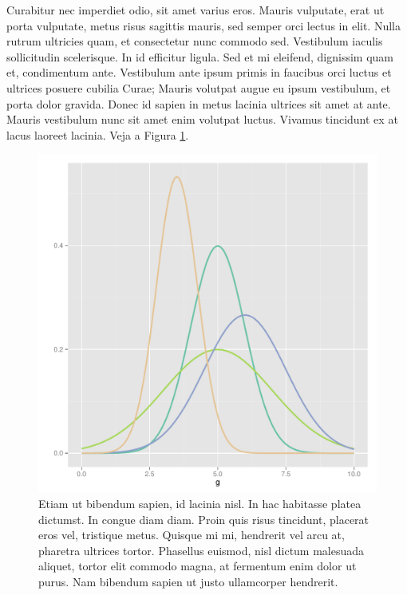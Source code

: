 \begin{btUnit}
Curabitur nec imperdiet odio, sit amet varius eros. Mauris vulputate,
erat ut porta vulputate, metus risus sagittis mauris, sed semper orci
lectus in elit. Nulla rutrum ultricies quam, et consectetur nunc
commodo sed. Vestibulum iaculis sollicitudin scelerisque. In id
efficitur ligula. Sed et mi eleifend, dignissim quam et, condimentum
ante. Vestibulum ante ipsum primis in faucibus orci luctus et ultrices
posuere cubilia Curae; Mauris volutpat augue eu ipsum vestibulum, et
porta dolor gravida. Donec id sapien in metus lacinia ultrices sit
amet at ante. Mauris vestibulum nunc sit amet enim volutpat luctus.
Vivamus tincidunt ex at lacus laoreet lacinia. Veja a Figura
\ref{fig:22}.

\begin{figure}[htb]
  \centering
  \includegraphics[scale=0.45]{figuras/distributions.pdf}
  \caption{Etiam ut bibendum sapien, id lacinia nisl. In hac
    habitasse platea dictumst. In congue diam diam. Proin quis risus
    tincidunt, placerat eros vel, tristique metus. Quisque mi mi,
    hendrerit vel arcu at, pharetra ultrices tortor. Phasellus
    euismod, nisl dictum malesuada aliquet, tortor elit commodo magna,
    at fermentum enim dolor ut purus. Nam bibendum sapien ut justo
    ullamcorper hendrerit.}
  \label{fig:22}
\end{figure}


\end{btUnit}
